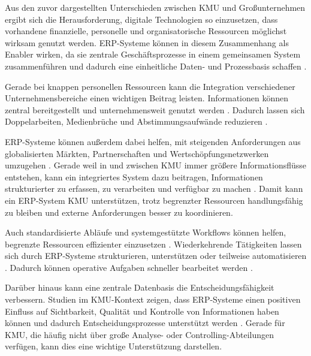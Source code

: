 
Aus den zuvor dargestellten Unterschieden zwischen KMU und Großunternehmen ergibt sich die 
Herausforderung, digitale Technologien so einzusetzen, dass vorhandene finanzielle, 
personelle und organisatorische Ressourcen möglichst wirksam genutzt werden. ERP-Systeme 
können in diesem Zusammenhang als Enabler wirken, da sie zentrale Geschäftsprozesse in 
einem gemeinsamen System zusammenführen und dadurch eine einheitliche Daten- und 
Prozessbasis schaffen \parencite{Haddara2011,Nach2008}.

Gerade bei knappen personellen Ressourcen kann die Integration verschiedener
Unternehmensbereiche einen wichtigen Beitrag leisten. Informationen 
können zentral bereitgestellt und unternehmensweit genutzt werden \parencite{Tereshchenko2016,Leyh2017}.
Dadurch lassen sich Doppelarbeiten, Medienbrüche und Abstimmungsaufwände
reduzieren \parencite{Tereshchenko2016,Leyh2017}. 

ERP-Systeme können außerdem dabei helfen, mit steigenden Anforderungen aus
globalisierten Märkten, Partnerschaften und Wertschöpfungsnetzwerken
umzugehen \parencite{Leyh2015}. Gerade weil in und zwischen KMU immer größere Informationsflüsse
entstehen, kann ein integriertes System dazu beitragen, Informationen
strukturierter zu erfassen, zu verarbeiten und verfügbar zu machen
\parencite{Haddara2011}. Damit kann ein ERP-System KMU unterstützen, trotz
begrenzter Ressourcen handlungsfähig zu bleiben und externe Anforderungen
besser zu koordinieren.

Auch standardisierte Abläufe und systemgestützte Workflows können helfen,
begrenzte Ressourcen effizienter einzusetzen \parencite{Leyh2015, Setiawati2014}. Wiederkehrende Tätigkeiten lassen
sich durch ERP-Systeme strukturieren, unterstützen oder teilweise
automatisieren \parencite{Leyh2015}. Dadurch können operative Aufgaben schneller bearbeitet werden \parencite{Leyh2015}. 

Darüber hinaus kann eine zentrale Datenbasis die Entscheidungsfähigkeit
verbessern. Studien im KMU-Kontext zeigen, dass ERP-Systeme einen positiven
Einfluss auf Sichtbarkeit, Qualität und Kontrolle von Informationen haben
können und dadurch Entscheidungsprozesse unterstützt werden
\parencite{Haddara2011}. 
Gerade für KMU, die häufig nicht über große Analyse-
oder Controlling-Abteilungen verfügen, kann dies eine wichtige Unterstützung
darstellen. 